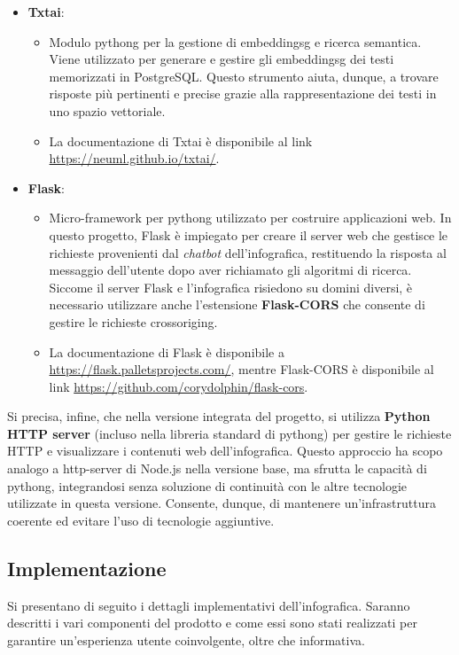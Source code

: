 \begin{itemize}
    \item \textbf{Txtai}:
    \begin{itemize}
        \item Modulo \gls{pythong} per la gestione di \gls{embeddingsg} e ricerca semantica. Viene utilizzato per generare e gestire gli \gls{embeddingsg} dei testi memorizzati in PostgreSQL. 
        Questo strumento aiuta, dunque, a trovare risposte più pertinenti e precise grazie alla rappresentazione dei testi in uno spazio vettoriale.
        \item La documentazione di Txtai è disponibile al link \href{https://neuml.github.io/txtai/}{https://neuml.github.io/txtai/}.
    \end{itemize}

    \item \textbf{Flask}:
    \begin{itemize}
        \item Micro-framework per \gls{pythong} utilizzato per costruire applicazioni web. In questo progetto, Flask è impiegato per creare il server web che gestisce le richieste 
        provenienti dal \emph{chatbot} dell'infografica, restituendo la risposta al messaggio dell'utente dopo aver richiamato gli algoritmi di ricerca. 
        Siccome il server Flask e l'infografica risiedono su domini diversi, è necessario utilizzare anche l'estensione \textbf{Flask-CORS} che consente di gestire le richieste \gls{crossoriging}.
        \item La documentazione di Flask è disponibile a \href{https://flask.palletsprojects.com/}{https://flask.palletsprojects.com/}, mentre Flask-CORS è disponibile al link 
        \href{https://github.com/corydolphin/flask-cors}{https://github.com/corydolphin/flask-cors}.
    \end{itemize}
\end{itemize}
Si precisa, infine, che nella versione integrata del progetto, si utilizza \textbf{Python HTTP server} (incluso nella libreria standard di \gls{pythong}) per gestire le richieste HTTP e visualizzare i contenuti web dell'infografica. 
Questo approccio ha scopo analogo a http-server di Node.js nella versione base, ma sfrutta le capacità di \gls{pythong}, integrandosi senza soluzione di continuità con le altre tecnologie utilizzate in questa versione. 
Consente, dunque, di mantenere un'infrastruttura coerente ed evitare l'uso di tecnologie aggiuntive.


\subsection{Implementazione}
Si presentano di seguito i dettagli implementativi dell'infografica. Saranno descritti i vari componenti del prodotto e come essi sono stati realizzati per garantire un'esperienza utente coinvolgente, oltre che informativa.

